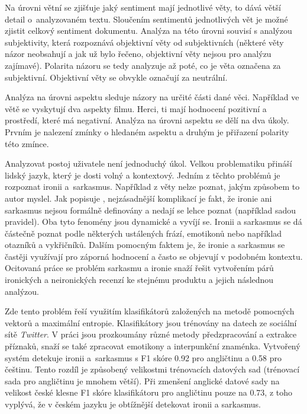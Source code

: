 Na úrovni větní se zjišťuje jaký sentiment mají jednotlivé věty, to dává větší detail o~analyzovaném textu. Sloučením sentimentů jednotlivých vět je možné zjistit celkový sentiment dokumentu. Analýza na této úrovni souvisí s analýzou subjektivity, která rozpoznává objektivní věty od subjektivních (některé věty názor neobsahují a jak už bylo řečeno, objektivní věty nejsou pro analýzu zajímavé). Polarita názoru se tedy analyzuje až poté, co je věta označena za subjektivní. Objektivní věty se obvykle označují za neutrální. 

Analýza na úrovni aspektu sleduje názory na určité části dané věci. Například ve větě  se vyskytují dva aspekty filmu. Herci, ti mají hodnocení pozitivní a prostředí, které má negativní. Analýza na úrovni aspektu se dělí na dva úkoly. Prvním je nalezení zmínky o hledaném aspektu a druhým je přiřazení polarity této zmínce.

Analyzovat postoj uživatele není jednoduchý úkol. Velkou problematiku přináší lidský jazyk, který je dosti volný a kontextový. Jedním z těchto problémů je rozpoznat ironii a~sarkasmus. 
Například z věty  nelze poznat, jakým způsobem to autor myslel.
Jak popisuje \cite{filatova-2012-irony}, nejzásadnější komplikací je fakt, že ironie ani sarkasmus nejsou formálně definovány a nedají se lehce poznat (například sadou pravidel). Oba tyto fenomény jsou dynamické a vyvíjí se. Ironii a sarkasmus se dá částečně poznat podle některých ustálených frází, emotikonů nebo například otazníků a vykřičníků. Dalším pomocným faktem je, že ironie a sarkasmus se častěji využívají pro záporná hodnocení a často se objevují v podobném kontextu. Ocitovaná práce se problém sarkasmu a ironie snaží řešit vytvořením párů ironických a neironických recenzí ke stejnému produktu a jejich následnou analýzou.

Zde \cite{Ptcek2014SarcasmDO} tento problém řeší využitím klasifikátorů založených na metodě pomocných vektorů a maximální entropie. Klasifikátory jsou trénovány na datech ze sociální sítě \emph{Twitter}. V práci jsou prozkoumány různé metody předzpracování a extrakce příznaků, snaží se také zpracovat emotikony a interpunkční znaménka. Vytvořený systém detekuje ironii a~sarkasmus s F1 skóre 0.92 pro angličtinu a 0.58 pro češtinu. Tento rozdíl je způsobený velikostmi trénovacích datových sad (trénovací sada pro angličtinu je mnohem větší). Při zmenšení anglické datové sady na velikost české klesne F1 skóre klasifikátoru pro angličtinu pouze na 0.73, z toho vyplývá, že v českém jazyku je obtížnější detekovat ironii a sarkasmus.  

